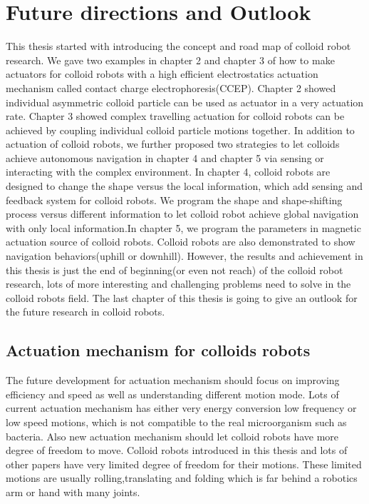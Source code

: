 \chapter{Future directions and Outlook}
This thesis started with introducing the concept and road map of colloid robot research. We gave two examples in chapter 2 and chapter 3 of how to make actuators for colloid robots with a high efficient electrostatics actuation mechanism called contact charge electrophoresis(CCEP). Chapter 2 showed individual asymmetric colloid particle can be used as actuator in a very actuation rate. Chapter 3 showed complex travelling actuation for colloid robots can be achieved by coupling individual colloid particle motions together.  In addition to actuation of colloid robots, we further proposed two strategies to let colloids achieve autonomous navigation in chapter 4 and chapter 5 via sensing or interacting with the complex environment. In chapter 4, colloid robots are designed to change the shape versus the local information, which add sensing and feedback system for colloid robots. We program the shape and shape-shifting process versus different information to let colloid robot achieve global navigation with only local information.In chapter 5, we program the parameters in magnetic  actuation source of colloid robots. Colloid robots are also demonstrated to show navigation behaviors(uphill or downhill). However, the results and achievement in this thesis is just the end of beginning(or even not reach) of the colloid robot research, lots of more interesting and challenging problems need to solve in the colloid robots field. The last chapter of this thesis is going to give an outlook for the future research in colloid robots.
\section{Actuation mechanism for  colloids robots}
The future development for  actuation mechanism should focus on improving efficiency and speed as well as understanding different motion mode. Lots of current actuation mechanism has either very energy conversion low frequency or low speed motions, which is not compatible to the real microorganism such as bacteria. Also new actuation mechanism should let colloid robots have more degree of freedom to move. Colloid robots introduced in this thesis and lots of other papers have very limited degree of freedom for their motions. These limited motions are usually rolling,translating and folding which is far behind a robotics arm or hand with many joints. 


